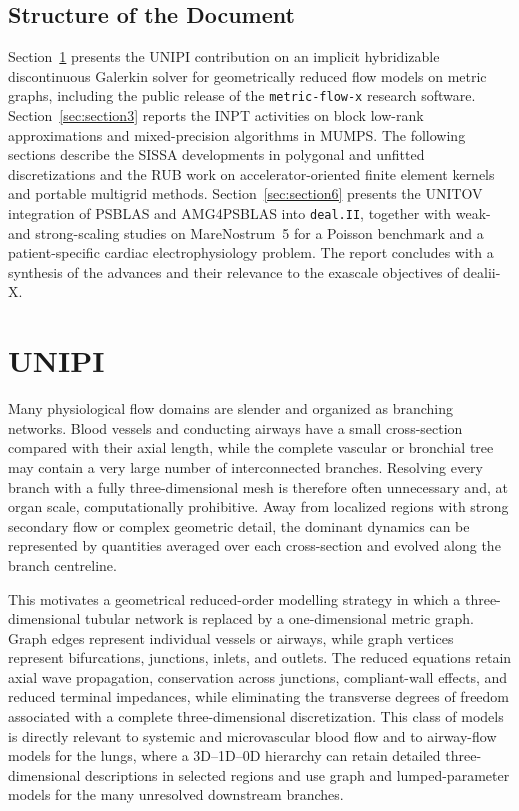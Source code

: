 \documentclass[a4paper,12pt]{article}
\begin{document}
\subsection{Structure of the Document}

Section~\ref{sec:section2} presents the UNIPI contribution on an implicit hybridizable discontinuous Galerkin solver for geometrically reduced flow models on metric graphs, including the public release of the \texttt{metric-flow-x} research software. Section~\ref{sec:section3} reports the INPT activities on block low-rank approximations and mixed-precision algorithms in MUMPS. The following sections describe the SISSA developments in polygonal and unfitted discretizations and the RUB work on accelerator-oriented finite element kernels and portable multigrid methods. Section~\ref{sec:section6} presents the UNITOV integration of PSBLAS and AMG4PSBLAS into \texttt{deal.II}, together with weak- and strong-scaling studies on MareNostrum~5 for a Poisson benchmark and a patient-specific cardiac electrophysiology problem. The report concludes with a synthesis of the advances and their relevance to the exascale objectives of dealii-X.
\newpage

\section{UNIPI}
\label{sec:section2}

Many physiological flow domains are slender and organized as branching networks. Blood vessels and conducting airways have a small cross-section compared with their axial length, while the complete vascular or bronchial tree may contain a very large number of interconnected branches. Resolving every branch with a fully three-dimensional mesh is therefore often unnecessary and, at organ scale, computationally prohibitive. Away from localized regions with strong secondary flow or complex geometric detail, the dominant dynamics can be represented by quantities averaged over each cross-section and evolved along the branch centreline.

This motivates a geometrical reduced-order modelling strategy in which a three-dimensional tubular network is replaced by a one-dimensional metric graph. Graph edges represent individual vessels or airways, while graph vertices represent bifurcations, junctions, inlets, and outlets. The reduced equations retain axial wave propagation, conservation across junctions, compliant-wall effects, and reduced terminal impedances, while eliminating the transverse degrees of freedom associated with a complete three-dimensional discretization. This class of models is directly relevant to systemic and microvascular blood flow and to airway-flow models for the lungs, where a 3D--1D--0D hierarchy can retain detailed three-dimensional descriptions in selected regions and use graph and lumped-parameter models for the many unresolved downstream branches.
\end{document}

